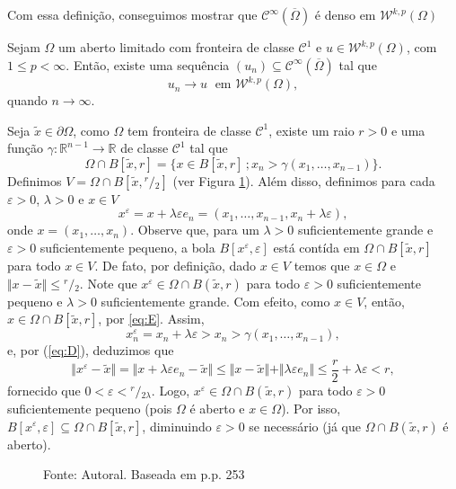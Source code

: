 \documentclass[a4paper, 11pt]{book}
\theoremstyle{definition}
\newcommand{\bR}{\mathbb{R}}
\newcommand{\cC}{\mathcal{C}}
\newcommand{\cW}{\mathcal{W}}
\newcommand{\sfrac}[2]{{}^{#1}\!\!/\!_{#2}}
\begin{document}
Com essa definição, conseguimos mostrar que $\cC^{\infty}(\overline{\Omega})$ é denso em $\cW^{k,p}(\Omega)$

\begin{tbox} \label{thm:aprox3}
    Sejam $\Omega$ um aberto limitado com fronteira de classe $\cC^1$ e $u \in \cW^{k,p}(\Omega)$, com $1 \leqslant p < \infty$.
    Então, existe uma sequência $(u_n) \subseteq \cC^\infty(\overline\Omega)$ tal que
    \[
        u_n \to u \;\text{ em } \cW^{k,p}(\Omega),
    \]
    quando $n \to \infty$.
\end{tbox}
\begin{prf}
    Seja $\tilde x \in \partial \Omega$, como $\Omega$ tem fronteira de classe $\cC^1$, existe um raio $r > 0$ e uma função $\gamma : \bR^{n-1} \to \bR$ de classe $\cC^1$ tal que
    \begin{equation} \label{eq:E}
        \Omega \cap B[\tilde x, r] = \{x \in B[\tilde x, r] \,; x_n > \gamma(x_1,\dots,x_{n-1})\}.
    \end{equation}
    Definimos $V = \Omega \cap B[\tilde x, \sfrac{r}{2}]$ (ver Figura \ref{fig:conjunto-demonstracao-aprox-3}).
    Além disso, definimos para cada $\varepsilon > 0$, $\lambda > 0$ e $x \in V$
    \begin{equation} \label{eq:D}
        x^\varepsilon = x + \lambda \varepsilon e_n = (x_1,\dots,x_{n-1}, x_n + \lambda\varepsilon),
    \end{equation}
    onde $x = (x_1,\dots,x_n)$.
    Observe que, para um $\lambda > 0$ suficientemente grande e $\varepsilon > 0$ suficientemente pequeno, a bola $B[x^\varepsilon\!,\varepsilon]$ está contída em $\Omega \cap B[\tilde x,r]$ para todo $x \in V$.
    De fato, por definição, dado $x \in V$ temos que $x \in \Omega$ e $\Vert x - \tilde x \Vert \leqslant \sfrac{r}{2}$.
    Note que $x^\varepsilon \in \Omega \cap B(\tilde x, r)$ para todo $\varepsilon > 0$ suficientemente pequeno e $\lambda > 0$ suficientemente grande.
    Com efeito, como $x \in V$, então, $x \in \Omega \cap B[\tilde x, r]$, por \ref{eq:E}. Assim,
    \[
        x^\varepsilon_n = x_n + \lambda \varepsilon > x_n >  \gamma(x_{1},\dots,x_{n-1}),
    \]
    e, por (\ref{eq:D}), deduzimos que
    \[
        \Vert x^\varepsilon - \tilde x \Vert = \Vert x + \lambda \varepsilon e_n - \tilde x \Vert \leqslant \Vert x - \tilde x \Vert + \Vert \lambda \varepsilon e_n  \Vert \leqslant \frac{r}{2} + \lambda\varepsilon < r,
    \]
    fornecido que $0 <\varepsilon < \sfrac{r}{2\lambda}$.
    Logo, $x^\varepsilon \in \Omega \cap B(\tilde x, r)$ para todo $\varepsilon > 0$ suficientemente pequeno (pois $\Omega$ é aberto e $x \in \Omega$).
    Por isso,
    $B[x^\varepsilon\!, \varepsilon] \subseteq \Omega \cap B[\tilde x,r]$, diminuindo $\varepsilon > 0$ se necessário (já que $\Omega \cap B(\tilde x, r)$ é aberto).
    \begin{figure}
        \centering
        
        \caption{Fonte: Autoral. Baseada em \cite{evans-pde} p.p. 253}
        \label{fig:conjunto-demonstracao-aprox-3}
    \end{figure}


\end{prf}
\end{document}
